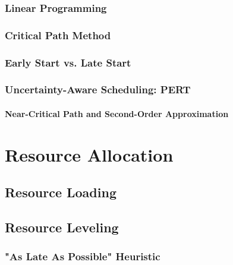         \subsection{Linear Programming} %

        \subsection{Critical Path Method} %

        \subsection{Early Start vs. Late Start} %

        \subsection{Uncertainty-Aware Scheduling: PERT} %

            \subsubsection{Near-Critical Path and Second-Order Approximation} %

\chapter{Resource Allocation} %

    \section{Resource Loading} %

    \section{Resource Leveling} %

        \subsection{"As Late As Possible" Heuristic} %

